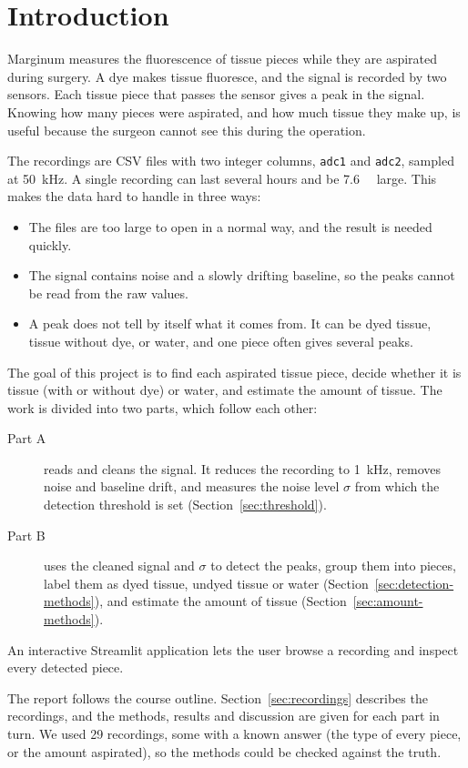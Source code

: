 \section{Introduction}

Marginum measures the fluorescence of tissue pieces while they are aspirated during surgery.
A dye makes tissue fluoresce, and the signal is recorded by two sensors. Each tissue piece
that passes the sensor gives a peak in the signal. %
Knowing how many pieces were aspirated, and how much tissue they make up, is useful because
the surgeon cannot see this during the operation. %

The recordings are CSV files with two integer columns, \texttt{adc1} and \texttt{adc2},
sampled at \SI{50}{\kilo\hertz}. A single recording can last several hours and be
\SI{7.6}{\giga\byte} large. This makes the data hard to handle in three ways:
\begin{itemize}
  \item The files are too large to open in a normal way, and the result is needed quickly.
  \item The signal contains noise and a slowly drifting baseline, so the peaks cannot be
        read from the raw values.
  \item A peak does not tell by itself what it comes from. It can be dyed tissue, tissue without
        dye, or water, and one piece often gives several peaks.
\end{itemize}

The goal of this project is to find each aspirated tissue piece, decide whether it is tissue
(with or without dye) or water, and estimate the amount of tissue. The work is divided into
two parts, which follow each other:
\begin{description}
  \item[Part A] reads and cleans the signal. It reduces the recording to
        \SI{1}{\kilo\hertz}, removes noise and baseline drift, and measures the noise level
        $\sigma$ from which the detection threshold is set (Section~\ref{sec:threshold}).
  \item[Part B] uses the cleaned signal and $\sigma$ to detect the peaks, group them into pieces,
        label them as dyed tissue, undyed tissue or water
        (Section~\ref{sec:detection-methods}), and estimate the amount of tissue
        (Section~\ref{sec:amount-methods}).
\end{description}
An interactive Streamlit application lets the user browse a recording and inspect every
detected piece.

The report follows the course outline. Section~\ref{sec:recordings} describes the recordings,
and the methods, results and discussion are given for each part in turn. We used 29 recordings,
some with a known answer (the type of every piece, or the amount aspirated), so the methods
could be checked against the truth.